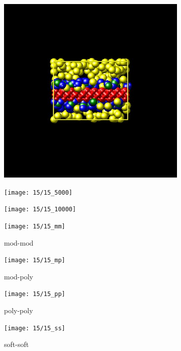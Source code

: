 \documentclass[a4paper]{article}
\begin{document}
\begin{figure}[H]
\begin{subfigure}{0.3\textwidth}
  \centering
  \includegraphics[width=\linewidth,keepaspectratio]{start}
  \caption{}
\end{subfigure}
\begin{subfigure}{0.3\textwidth}
  \centering
  \texttt{[image: 15/15\_5000]}
  \caption{}
\end{subfigure}
\begin{subfigure}{0.3\textwidth}
  \centering
  \texttt{[image: 15/15\_10000]}
  \caption{}
\end{subfigure}
\caption{}
\label{fig_1}
\end{figure}

\begin{figure}[H]
\begin{subfigure}{0.24\textwidth}
  \centering
  \texttt{[image: 15/15\_mm]}
  \caption{mod-mod}
\end{subfigure}
\begin{subfigure}{0.24\textwidth}
  \centering
  \texttt{[image: 15/15\_mp]}
  \caption{mod-poly}
\end{subfigure}
\begin{subfigure}{0.24\textwidth}
  \centering
  \texttt{[image: 15/15\_pp]}
  \caption{poly-poly}
\end{subfigure}
\begin{subfigure}{0.24\textwidth}
  \centering
  \texttt{[image: 15/15\_ss]}
  \caption{soft-soft}
\end{subfigure}
\caption{}
\label{fig_1}
\end{figure}
\end{document}
